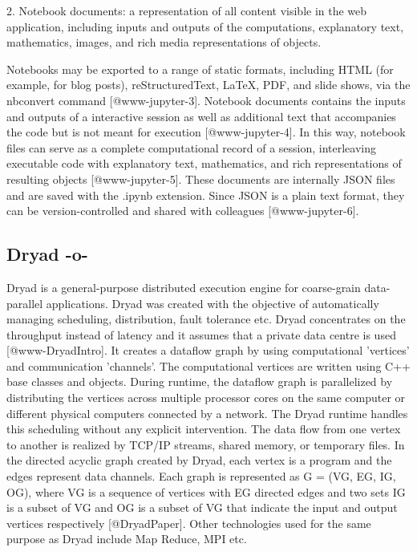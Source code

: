 2. Notebook documents: a representation of all content visible in the
web application, including inputs and outputs of the computations,
explanatory text, mathematics, images, and rich media representations
of objects.

Notebooks may be exported to a range of static formats, including HTML
(for example, for blog posts), reStructuredText, LaTeX, PDF, and slide
shows, via the nbconvert command [@www-jupyter-3].  Notebook
documents contains the inputs and outputs of a interactive session as
well as additional text that accompanies the code but is not meant for
execution [@www-jupyter-4]. In this way, notebook files can
serve as a complete computational record of a session, interleaving
executable code with explanatory text, mathematics, and rich
representations of resulting objects [@www-jupyter-5]. These
documents are internally JSON files and are saved with the .ipynb
extension. Since JSON is a plain text format, they can be
version-controlled and shared with colleagues [@www-jupyter-6].

\subsection{Dryad -o-}

Dryad is a general-purpose distributed execution engine for
coarse-grain data-parallel applications. Dryad was created with the
objective of automatically managing scheduling, distribution, fault
tolerance etc. Dryad concentrates on the throughput instead of latency
and it assumes that a private data centre is
used [@www-DryadIntro].  It creates a dataflow graph by using
computational 'vertices' and communication 'channels'. The
computational vertices are written using C++ base classes and
objects. During runtime, the dataflow graph is parallelized by
distributing the vertices across multiple processor cores on the same
computer or different physical computers connected by a network. The
Dryad runtime handles this scheduling without any explicit
intervention. The data flow from one vertex to another is realized by
TCP/IP streams, shared memory, or temporary files. In the directed
acyclic graph created by Dryad, each vertex is a program and the edges
represent data channels. Each graph is represented as G = (VG, EG, IG,
OG), where VG is a sequence of vertices with EG directed edges and two
sets IG is a subset of VG and OG is a subset of VG that indicate the
input and output vertices respectively [@DryadPaper]. Other
technologies used for the same purpose as Dryad include Map Reduce,
MPI etc.




